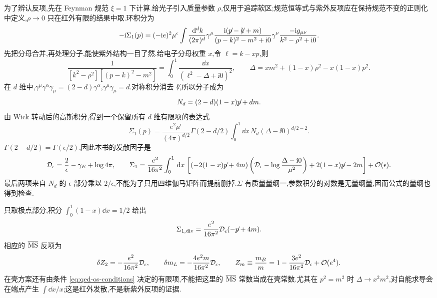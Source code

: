 为了辨认反项,先在 Feynman 规范 $\xi=1$ 下计算.给光子引入质量参数 $\rho$,仅用于追踪软区;规范恒等式与紫外反项应在保持规范不变的正则化中定义,$\rho\to0$ 只在红外有限的结果中取.环积分为
\begin{equation}
 -\ii\Sigma_1(p)=(-\ii e)^2\mu^\epsilon
 \int\frac{\dd^dk}{(2\pi)^d}
 \gamma^\mu\frac{\ii(\slashed p-\slashed k+m)}{(p-k)^2-m^2+\ii0}
 \gamma^\nu\frac{-\ii g_{\mu\nu}}{k^2-\rho^2+\ii0}.
 \label{eq:qed-self-loop}
\end{equation}
先把分母合并,再处理分子,能使紫外结构一目了然.给电子分母权重 $x$,令 $\ell=k-xp$,则
\begin{equation}
 \frac1{[k^2-\rho^2][(p-k)^2-m^2]}
 =\int_0^1\frac{\dd x}{(\ell^2-\Delta+\ii0)^2},\qquad
 \Delta=xm^2+(1-x)\rho^2-x(1-x)p^2.
 \label{eq:qed-self-delta}
\end{equation}
在 $d$ 维中,$\gamma^\mu\gamma^\alpha\gamma_\mu=(2-d)\gamma^\alpha$,$\gamma^\mu\gamma_\mu=d$.对称积分消去 $\slashed\ell$,所以分子成为
\begin{equation}
 N_d=(2-d)(1-x)\slashed p+dm.
\end{equation}
由 Wick 转动后的高斯积分,得到一个保留所有 $d$ 维有限项的表达式
\begin{equation}
 \Sigma_1(p)=\frac{e^2\mu^\epsilon}{(4\pi)^{d/2}}
 \Gamma(2-d/2)\int_0^1\dd x\,N_d
 (\Delta-\ii0)^{d/2-2}.
 \label{eq:qed-self-parameter}
\end{equation}
$\Gamma(2-d/2)=\Gamma(\epsilon/2)$,因此本书的发散因子是
\begin{equation}
 \mathcal D_\epsilon=\frac2\epsilon-\gamma_E+\log4\pi,
 \qquad
 \Sigma_1=\frac{e^2}{16\pi^2}\int_0^1\dd x\,
 \left[(-2(1-x)\slashed p+4m)
 \left(\mathcal D_\epsilon-\log\frac{\Delta-\ii0}{\mu^2}\right)
 +2(1-x)\slashed p-2m\right]+\order(\epsilon).
 \label{eq:qed-self-expanded}
\end{equation}
最后两项来自 $N_d$ 的 $\epsilon$ 部分乘以 $2/\epsilon$,不能为了只用四维伽马矩阵而提前删掉.$\Sigma$ 有质量量纲一,参数积分的对数是无量纲量,因而公式的量纲也得到检查.

只取极点部分,积分 $\int_0^1(1-x)\dd x=1/2$ 给出
\begin{equation}
 \Sigma_{1,\rm div}=\frac{e^2}{16\pi^2}\mathcal D_\epsilon
                 (-\slashed p+4m).
\end{equation}
相应的 $\overline{\rm MS}$ 反项为
\begin{equation}
 \delta Z_2=-\frac{e^2}{16\pi^2}\mathcal D_\epsilon,
 \qquad \delta m_L=-\frac{4e^2m}{16\pi^2}\mathcal D_\epsilon,
 \qquad Z_m\equiv\frac{m_B}{m}
       =1-\frac{3e^2}{16\pi^2}\mathcal D_\epsilon+\order(e^4).
 \label{eq:qed-one-loop-z2-zm}
\end{equation}
在壳方案还有由条件 \eqref{eq:qed-os-conditions} 决定的有限项,不能把这里的 $\overline{\rm MS}$ 常数当成在壳常数.尤其在 $p^2=m^2$ 时 $\Delta\to x^2m^2$,对自能求导会在端点产生 $\int\dd x/x$;这是红外发散,不是新紫外反项的证据.

